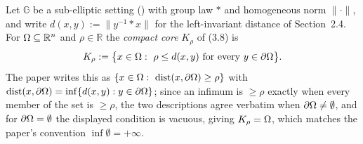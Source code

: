 \begin{definition}
Let $\mathbb G$ be a sub-elliptic setting () with group law $*$ and
homogeneous norm $\|\cdot\|$, and write $d(x,y):=\|y^{-1}*x\|$ for the left-invariant
distance of Section~2.4. For $\Omega\subseteq\mathbb R^{n}$ and $\rho\in\mathbb R$ the
\emph{compact core} $K_\rho$ of (3.8) is
\[
 K_\rho:=\big\{x\in\Omega:\ \rho\le d(x,y)\ \text{for every}\ y\in\partial\Omega\big\} .
\]
The paper writes this as $\{x\in\Om:\ \dist(x,\del\Om)\ge\rho\}$ with
$\operatorname{dist}(x,\partial\Omega)=\inf\{d(x,y):y\in\partial\Omega\}$; since an infimum is $\ge\rho$ exactly
when every member of the set is $\ge\rho$, the two descriptions agree verbatim when
$\partial\Omega\ne\emptyset$, and for $\partial\Omega=\emptyset$ the displayed condition is vacuous,
giving $K_\rho=\Omega$, which matches the paper's convention $\inf\emptyset=+\infty$.
\end{definition}
